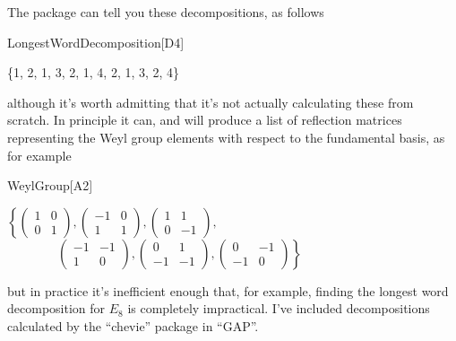 The  package can tell you these decompositions, as follows
\begin{mma}
\begin{inm}LongestWordDecomposition[D4]\end{inm}
\begin{outm}\{1, 2, 1, 3, 2, 1, 4, 2, 1, 3, 2, 4\}
\end{outm}
\end{mma}
although it's worth admitting that it's not actually calculating these from scratch. In principle it can, and will produce a list of reflection matrices
representing the Weyl group elements with respect to the fundamental basis, as for example
\begin{mma}
\begin{inm}WeylGroup[A2]\end{inm}
\begin{outm}$\left\{\left(\begin{array}{rr} 1 & 0 \\ 0 & 1\end{array}\right),\left(\begin{array}{rr} -1 & 0 \\ 1 & 1\end{array}\right),\left(\begin{array}{rr} 1 & 1 \\ 0 & -1\end{array}\right),\right.$
$\qquad\qquad\left.\left(\begin{array}{rr} -1 & -1 \\ 1 & 0\end{array}\right),\left(\begin{array}{rr} 0 & 1 \\ -1 & -1\end{array}\right),\left(\begin{array}{rr} 0 & -1 \\ -1 & 0\end{array}\right)\right\}$
\end{outm}
\end{mma}
but in practice it's inefficient enough that, for example, finding the longest word decomposition for $E_8$ is completely impractical. I've included
decompositions calculated by the ``chevie'' package in ``GAP''.

